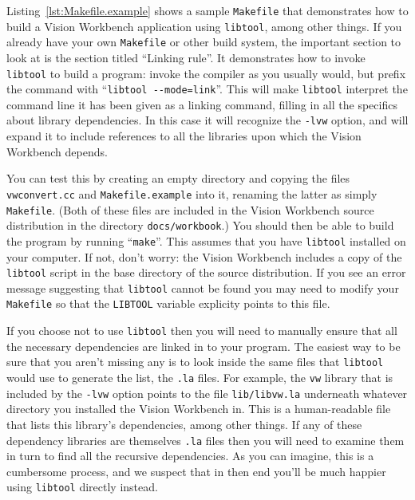 
Listing~\ref{lst:Makefile.example} shows a sample \verb#Makefile# 
that demonstrates how to build a Vision Workbench application using 
\verb#libtool#, among other things.  If you already have your own 
\verb#Makefile# or other build system, the important section to 
look at is the section titled ``Linking rule''.  It demonstrates 
how to invoke \verb#libtool# to build a program: invoke the compiler 
as you usually would, but prefix the command with 
``\verb#libtool --mode=link#''.  This will make \verb#libtool# 
interpret the command line it has been given as a linking command, 
filling in all the specifics about library dependencies.  In this 
case it will recognize the \verb#-lvw# option, and will expand it 
to include references to all the libraries upon which the Vision 
Workbench depends.

You can test this by creating an empty directory and copying the 
files \verb#vwconvert.cc# and \verb#Makefile.example# into it, 
renaming the latter as simply \verb#Makefile#.  (Both of these 
files are included in the Vision Workbench source distribution 
in the directory \verb#docs/workbook#.)  You should then 
be able to build the program by running ``\verb#make#''. 
This assumes that you have \verb#libtool# installed on your 
computer.  If not, don't worry: the Vision Workbench includes a 
copy of the \verb#libtool# script in the base directory of the 
source distribution.  If you see an error message suggesting that 
\verb#libtool# cannot be found you may need to modify your 
\verb#Makefile# so that the \verb#LIBTOOL# variable explicity 
points to this file.

If you choose not to use \verb#libtool# then you will need to manually
ensure that all the necessary dependencies are linked in to your
program.  The easiest way to be sure that you aren't missing any is to
look inside the same files that \verb#libtool# would use to generate
the list, the \verb#.la# files.  For example, the \verb#vw# library
that is included by the \verb#-lvw# option points to the file
\verb#lib/libvw.la# underneath whatever directory you installed the
Vision Workbench in.  This is a human-readable file that lists this
library's dependencies, among other things.  If any of these
dependency libraries are themselves \verb#.la# files then you will
need to examine them in turn to find all the recursive dependencies.
As you can imagine, this is a cumbersome process, and we suspect that
in then end you'll be much happier using \verb#libtool# directly
instead.

